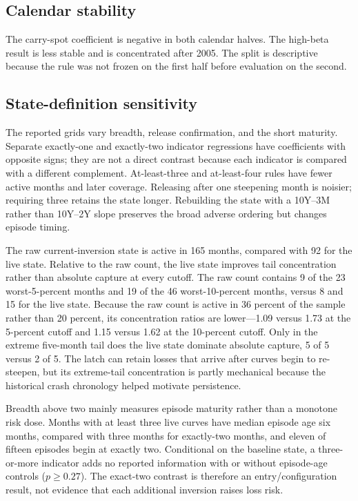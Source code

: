 \subsection{Calendar stability}

The carry-spot coefficient is negative in both calendar halves. The high-beta result is less stable and is concentrated after 2005. The split is descriptive because the rule was not frozen on the first half before evaluation on the second.



\subsection{State-definition sensitivity}

The reported grids vary breadth, release confirmation, and the short maturity. Separate exactly-one and exactly-two indicator regressions have coefficients with opposite signs; they are not a direct contrast because each indicator is compared with a different complement. At-least-three and at-least-four rules have fewer active months and later coverage. Releasing after one steepening month is noisier; requiring three retains the state longer. Rebuilding the state with a 10Y--3M rather than 10Y--2Y slope preserves the broad adverse ordering but changes episode timing.

The raw current-inversion state is active in 165 months, compared with 92 for the live state. Relative to the raw count, the live state improves tail concentration rather than absolute capture at every cutoff. The raw count contains 9 of the 23 worst-5-percent months and 19 of the 46 worst-10-percent months, versus 8 and 15 for the live state. Because the raw count is active in 36 percent of the sample rather than 20 percent, its concentration ratios are lower---1.09 versus 1.73 at the 5-percent cutoff and 1.15 versus 1.62 at the 10-percent cutoff. Only in the extreme five-month tail does the live state dominate absolute capture, 5 of 5 versus 2 of 5. The latch can retain losses that arrive after curves begin to re-steepen, but its extreme-tail concentration is partly mechanical because the historical crash chronology helped motivate persistence.

Breadth above two mainly measures episode maturity rather than a monotone risk dose. Months with at least three live curves have median episode age six months, compared with three months for exactly-two months, and eleven of fifteen episodes begin at exactly two. Conditional on the baseline state, a three-or-more indicator adds no reported information with or without episode-age controls ($p\geq0.27$). The exact-two contrast is therefore an entry/configuration result, not evidence that each additional inversion raises loss risk.

